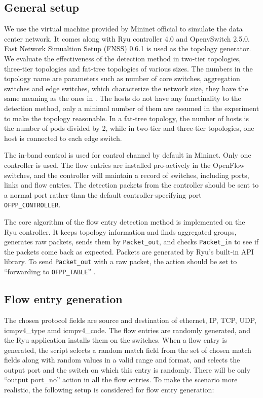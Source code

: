 \documentclass[conference]{IEEEtran}
\begin{document}
\subsection{General setup}
We use the virtual machine provided by Mininet official to simulate the data center network. It comes along with Ryu controller 4.0 and OpenvSwitch 2.5.0. Fast Network Simualtion Setup (FNSS) 0.6.1 is used as the topology generator. We evaluate the effectiveness of the detection method in two-tier topologies, three-tier topologies and fat-tree topologies of various sizes. The numbers in the topology name are parameters such as number of core switches, aggregation switches and edge switches, which characterize the network size, they have the same meaning as the ones in \cite{FNSS}. The hosts do not have any functinality to the detection method, only a minimal number of them are assumed in the experiment to make the topology reasonable. In a fat-tree topology, the number of hosts is the number of pods divided by 2, while in two-tier and three-tier topologies, one host is connected to each edge switch.

The in-band control is used for control channel by default in Mininet. Only one controller is used. The flow entries are installed pro-actively in the OpenFlow switches, and the controller will maintain a record of switches, including ports, links and flow entries. The detection packets from the controller should be sent to a normal port rather than the default controller-specifying port \texttt{OFPP\_CONTROLLER}.

The core algorithm of the flow entry detection method is implemented on the Ryu controller. It keeps topology information and finds aggregated groups, generates raw packets, sends them by \texttt{Packet\_out}, and checks \texttt{Packet\_in} to see if the packets come back as expected. Packets are generated by Ryu's built-in API library. To send \texttt{Packet\_out} with a raw packet, the action should be set to ``forwarding to \texttt{OFPP\_TABLE}'' \cite{PACKETOUT}. 

\subsection{Flow entry generation}
\label{flow_entry_generation}
The chosen protocol fields are source and destination of ethernet, IP, TCP, UDP, icmpv4\_type amd icmpv4\_code. The flow entries are randomly generated, and the Ryu application installs them on the switches. When a flow entry is generated, the script selects a random match field from the set of chosen match fields along with random values in a valid range and format, and selects the output port and the switch on which this entry is randomly. There will be only ``output port\_no'' action in all the flow entries. To make the scenario more realistic, the following setup is considered for flow entry generation:
\end{document}
